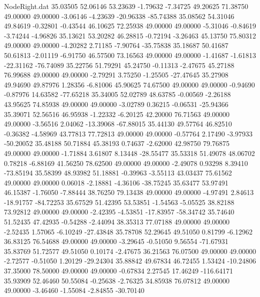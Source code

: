 \begin{filecontents}{NodeRight.dat}
  35.03505   52.06146   53.23639    -1.79632   -7.34725   49.20625   71.38750   49.00000   49.00000   -3.06146   -4.23639  -20.96338  -85.74388
  35.08562   54.31046   49.84619    -0.32801   -0.43544   46.10625   72.25938   49.00000   49.00000   -5.31046   -0.84619   -3.74244   -4.96826
  35.13621   53.20282   46.28815    -0.72194   -3.26463   45.13750   75.80312   49.00000   49.00000   -4.20282    2.71185   -7.90764  -35.75838
  35.18687   50.41687   50.61813    -2.01119   -6.91750   46.57500   73.16563   49.00000   49.00000   -1.41687   -1.61813  -22.31162  -76.74089
  35.22756   51.79291   45.24750    -0.11313   -2.47675   45.27188   76.99688   49.00000   49.00000   -2.79291    3.75250   -1.25505  -27.47645
  35.27908   49.94690   49.87976     1.28356   -6.81006   45.90625   74.67500   49.00000   49.00000   -0.94690   -0.87976   14.63582  -77.65218
  35.34005   52.02789   48.63785    -0.00569   -2.26188   43.95625   74.85938   49.00000   49.00000   -3.02789    0.36215   -0.06531  -25.94366
  35.39071   52.56516   46.95938    -1.22332   -6.20125   42.20000   76.71563   49.00000   49.00000   -3.56516    2.04062  -13.39068  -67.88015
  35.44130   49.57764   46.82510    -0.36382   -4.58969   43.77813   77.72813   49.00000   49.00000   -0.57764    2.17490   -3.97933  -50.20052
  35.48188   50.71884   45.38193     0.74637   -2.62000   42.98750   79.76875   49.00000   49.00000   -1.71884    3.61807    8.13448  -28.55477
  35.53318   51.49078   48.06702     0.78218   -6.88169   41.56250   78.62500   49.00000   49.00000   -2.49078    0.93298    8.39410  -73.85194
  35.58399   48.93982   51.18881    -0.39963   -3.55113   43.03437   75.61562   49.00000   49.00000    0.06018   -2.18881   -4.36106  -38.75245
  35.63477   53.97491   46.15387    -1.76050   -7.88444   38.76250   79.13438   49.00000   49.00000   -4.97491    2.84613  -18.91757  -84.72253
  35.67529   51.42395   53.53851    -1.54563   -5.05525   38.82188   73.92812   49.00000   49.00000   -2.42395   -4.53851  -17.83957  -58.34742
  35.74640   51.52435   47.42935    -0.54288   -2.44094   38.35313   77.07188   49.00000   49.00000   -2.52435    1.57065   -6.10249  -27.43848
  35.78708   52.29645   49.51050     0.81799   -6.12962   36.83125   76.54688   49.00000   49.00000   -3.29645   -0.51050    9.56554  -71.67931
  35.83769   51.72577   49.51050     0.10174   -2.47675   36.21563   76.07500   49.00000   49.00000   -2.72577   -0.51050    1.20129  -29.24304
  35.88842   49.67834   46.72455     1.53424  -10.24806   37.35000   78.50000   49.00000   49.00000   -0.67834    2.27545   17.46249 -116.64171
  35.93909   52.46460   50.55084    -0.25638   -2.76325   34.85938   76.07812   49.00000   49.00000   -3.46460   -1.55084   -2.84855  -30.70140

\end{filecontents}
